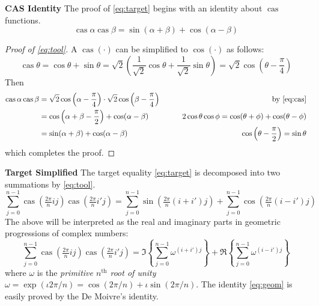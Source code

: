 \documentclass[12pt]{article}
\DeclareMathOperator{\cas}{cas}
\begin{document}
\noindent\textbf{\textsf{CAS Identity}}\quad
The proof of \eqref{eq:target} begins with an identity about $\cas$ functions.
\begin{equation}
  \cas\alpha\cas\beta = \sin(\alpha+\beta) + \cos(\alpha-\beta)
  \label{eq:tool}
\end{equation}
\begin{proof}[Proof of \eqref{eq:tool}]
A $\cas(\cdot)$ can be simplified to $\cos(\cdot)$ as follows:
\begin{equation}
  \cas\theta
  =
  \cos\theta + \sin\theta
  =
  \sqrt{2}\left(
    \frac{1}{\sqrt 2}\cos\theta + \frac{1}{\sqrt 2}\sin\theta
  \right)
  =
  \sqrt{2}\cos\left(\theta - \frac{\pi}{4}\right)
  \tag{$\ast$}
  \label{eq:cas}
\end{equation}
Then
\begin{alignat*}{2}
  \cas\alpha\cas\beta
  &=
  \sqrt{2}\cos\left(\alpha - \frac{\pi}{4}\right)
  \cdot
  \sqrt{2}\cos\left(\beta - \frac{\pi}{4}\right)
  &
  \quad\quad\text{by \eqref{eq:cas}}
  \\
  &=
  \cos\left(\alpha + \beta - {\frac \pi 2}\right)
  +
  \cos(\alpha - \beta)
  &
  \quad\quad
  2\cos\theta\cos\phi
  =
  \cos(\theta+\phi) + \cos(\theta-\phi)
  \\
  &=
  \sin(\alpha + \beta) + \cos(\alpha - \beta)
  &
  \quad\quad
  \cos\left(\theta-\frac{\pi}{2}\right) = \sin\theta
\end{alignat*}
which completes the proof.
\end{proof}

\noindent\textbf{\textsf{Target Simplified}}\quad
The target equality \eqref{eq:target} is decomposed into two summations by
\eqref{eq:tool}.
\begin{equation*}
  \sum_{j=0}^{n-1}
  \cas\left(\tfrac{2\pi}{n}ij\right) \cas\left(\tfrac{2\pi}{n}i'j\right)
  =
  \sum_{j=0}^{n-1} \sin\left(\tfrac{2\pi}{n}(i+i')j\right)
  +
  \sum_{j=0}^{n-1} \cos\left(\tfrac{2\pi}{n}(i-i')j\right)
\end{equation*}
The above will be interpreted as the real and imaginary parts in 
geometric progressions of complex numbers:
\begin{equation}
  \sum_{j=0}^{n-1}
  \cas\left(\tfrac{2\pi}{n}ij\right) \cas\left(\tfrac{2\pi}{n}i'j\right)
  =
  \Im\left\{\sum_{j=0}^{n-1} \omega^{(i+i')j} \right\}
  +
  \Re\left\{\sum_{j=0}^{n-1} \omega^{(i-i')j} \right\}
  \label{eq:geom}
\end{equation}
where $\omega$ is the \emph{primitive $n^{\mathrm{th}}$ root of unity}
$\omega=\exp(\iota 2\pi/n) = \cos(2\pi/n) + \iota\sin(2\pi/n)$.
The identity \eqref{eq:geom} is easily proved by the De Moivre's identity.
\end{document}
